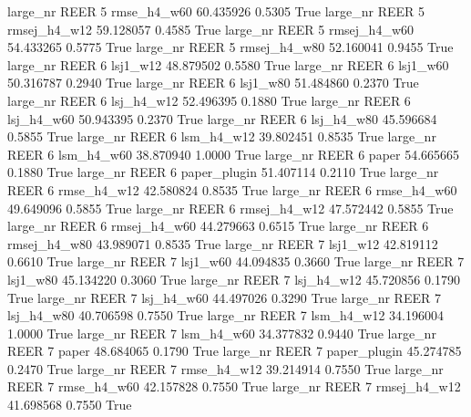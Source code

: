   large_nr     REER                 5  rmse_h4_w60   60.435926      0.5305    True
  large_nr     REER                 5 rmsej_h4_w12   59.128057      0.4585    True
  large_nr     REER                 5 rmsej_h4_w60   54.433265      0.5775    True
  large_nr     REER                 5 rmsej_h4_w80   52.160041      0.9455    True
  large_nr     REER                 6     lsj1_w12   48.879502      0.5580    True
  large_nr     REER                 6     lsj1_w60   50.316787      0.2940    True
  large_nr     REER                 6     lsj1_w80   51.484860      0.2370    True
  large_nr     REER                 6   lsj_h4_w12   52.496395      0.1880    True
  large_nr     REER                 6   lsj_h4_w60   50.943395      0.2370    True
  large_nr     REER                 6   lsj_h4_w80   45.596684      0.5855    True
  large_nr     REER                 6   lsm_h4_w12   39.802451      0.8535    True
  large_nr     REER                 6   lsm_h4_w60   38.870940      1.0000    True
  large_nr     REER                 6        paper   54.665665      0.1880    True
  large_nr     REER                 6 paper_plugin   51.407114      0.2110    True
  large_nr     REER                 6  rmse_h4_w12   42.580824      0.8535    True
  large_nr     REER                 6  rmse_h4_w60   49.649096      0.5855    True
  large_nr     REER                 6 rmsej_h4_w12   47.572442      0.5855    True
  large_nr     REER                 6 rmsej_h4_w60   44.279663      0.6515    True
  large_nr     REER                 6 rmsej_h4_w80   43.989071      0.8535    True
  large_nr     REER                 7     lsj1_w12   42.819112      0.6610    True
  large_nr     REER                 7     lsj1_w60   44.094835      0.3660    True
  large_nr     REER                 7     lsj1_w80   45.134220      0.3060    True
  large_nr     REER                 7   lsj_h4_w12   45.720856      0.1790    True
  large_nr     REER                 7   lsj_h4_w60   44.497026      0.3290    True
  large_nr     REER                 7   lsj_h4_w80   40.706598      0.7550    True
  large_nr     REER                 7   lsm_h4_w12   34.196004      1.0000    True
  large_nr     REER                 7   lsm_h4_w60   34.377832      0.9440    True
  large_nr     REER                 7        paper   48.684065      0.1790    True
  large_nr     REER                 7 paper_plugin   45.274785      0.2470    True
  large_nr     REER                 7  rmse_h4_w12   39.214914      0.7550    True
  large_nr     REER                 7  rmse_h4_w60   42.157828      0.7550    True
  large_nr     REER                 7 rmsej_h4_w12   41.698568      0.7550    True
